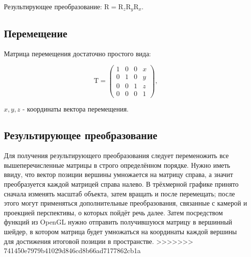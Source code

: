 Результирующее преобразование: \begin{math}\mathrm{R} = \mathrm{R}_z \mathrm{R}_y \mathrm{R}_x\end{math}.

\subsection{Перемещение}
Матрица перемещения достаточно простого вида:

\begin{equation}
\mathrm{T} = 
  \begin{pmatrix}
    1 & 0  & 0 & x\\
    0 & 1 & 0 & y\\
    0 & 0 & 1 & z\\
      0 & 0 & 0 & 1
  \end{pmatrix},
\end{equation}
\begin{eqrem}
\begin{math} x, y, z \end{math} - координаты вектора перемещения.
\end{eqrem}

\subsection{Результирующее преобразование}
Для получения результирующего преобразования следует переменожить все вышеперечисленные матрицы 
в строго определённом порядке. Нужно иметь ввиду, что вектор позиции вершины умножается на матрицу справа, 
а значит преобразуется каждой матрицей справа налево. В трёхмерной графике принято сначала изменять масштаб объекта, 
затем вращать и после перемещать; после этого могут применяться дополнительные преобразования, связанные с камерой 
и проекцией перспективы, о которых пойдёт речь далее. Затем посредством функций из OpenGL нужно отправить получившуюся 
матрицу в вершинный шейдер, в котором матрица будет умножаться на координаты каждой вершины для достижения итоговой 
позиции в пространстве.
>>>>>>> 741450e7979b41029d846cd8b66ad7177862cb1a
